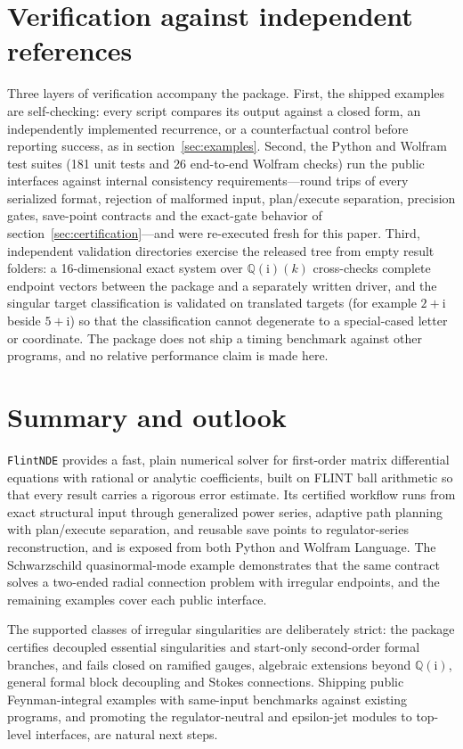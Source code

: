 \documentclass[11pt,a4paper]{article}
\newcommand{\ii}{\mathrm i}
\begin{document}
\section{Verification against independent references}
\label{sec:verification}

Three layers of verification accompany the package. First, the shipped examples are
self-checking: every script compares its output against a closed form, an independently
implemented recurrence, or a counterfactual control before reporting success, as in
section~\ref{sec:examples}. Second, the Python and Wolfram test suites (181 unit tests
and 26 end-to-end Wolfram checks) run the public interfaces against internal consistency
requirements---round trips of every serialized format, rejection of malformed input,
plan/execute separation, precision gates, save-point contracts and the exact-gate
behavior of section~\ref{sec:certification}---and were re-executed fresh for this paper.
Third, independent validation directories exercise the released tree from empty result
folders: a 16-dimensional exact system over $\mathbb Q(\ii)(k)$ cross-checks complete
endpoint vectors between the package and a separately written driver, and the singular
target classification is validated on translated targets (for example $2+\ii$ beside
$5+\ii$) so that the classification cannot degenerate to a special-cased letter or
coordinate. The package does not ship a timing benchmark against other programs, and no
relative performance claim is made here.

\section{Summary and outlook}
\label{sec:summary}

\texttt{FlintNDE} provides a fast, plain numerical solver for first-order matrix
differential equations with rational or analytic coefficients, built on FLINT ball
arithmetic so that every result carries a rigorous error estimate. Its certified workflow
runs from exact structural input through generalized power series, adaptive path planning
with plan/execute separation, and reusable save points to regulator-series
reconstruction, and is exposed from both Python and Wolfram Language. The Schwarzschild
quasinormal-mode example demonstrates that the same contract solves a two-ended radial
connection problem with irregular endpoints, and the remaining examples cover each public
interface.

The supported classes of irregular singularities are deliberately strict: the package
certifies decoupled essential singularities and start-only second-order formal branches, and
fails closed on ramified gauges, algebraic extensions beyond $\mathbb Q(\ii)$, general
formal block decoupling and Stokes connections. Shipping public Feynman-integral examples
with same-input benchmarks against existing programs, and promoting the regulator-neutral
and epsilon-jet modules to top-level interfaces, are natural next steps.
\end{document}
